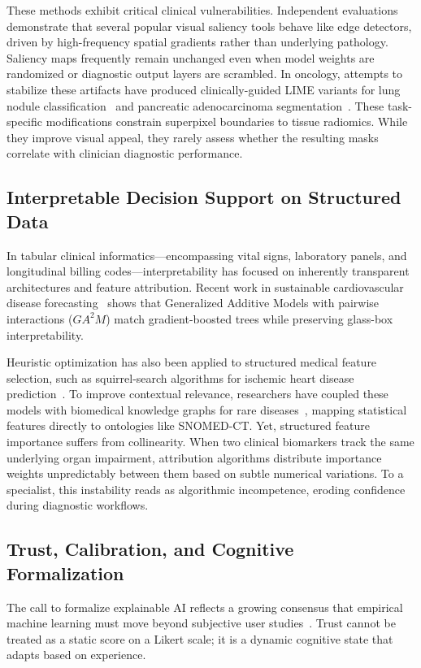 \documentclass[10pt,journal,compsoc]{IEEEtran}
\begin{document}
These methods exhibit critical clinical vulnerabilities. Independent evaluations demonstrate that several popular visual saliency tools behave like edge detectors, driven by high-frequency spatial gradients rather than underlying pathology. Saliency maps frequently remain unchanged even when model weights are randomized or diagnostic output layers are scrambled. In oncology, attempts to stabilize these artifacts have produced clinically-guided LIME variants for lung nodule classification~\cite{alshukri2026clinically} and pancreatic adenocarcinoma segmentation~\cite{badr2025xai}. These task-specific modifications constrain superpixel boundaries to tissue radiomics. While they improve visual appeal, they rarely assess whether the resulting masks correlate with clinician diagnostic performance.

\subsection{Interpretable Decision Support on Structured Data}
In tabular clinical informatics---encompassing vital signs, laboratory panels, and longitudinal billing codes---interpretability has focused on inherently transparent architectures and feature attribution. Recent work in sustainable cardiovascular disease forecasting~\cite{kvapilova2026sustainable} shows that Generalized Additive Models with pairwise interactions ($GA^2M$) match gradient-boosted trees while preserving glass-box interpretability. 

Heuristic optimization has also been applied to structured medical feature selection, such as squirrel-search algorithms for ischemic heart disease prediction~\cite{hemapraba2026xai}. To improve contextual relevance, researchers have coupled these models with biomedical knowledge graphs for rare diseases~\cite{soman2026knowledge}, mapping statistical features directly to ontologies like SNOMED-CT. Yet, structured feature importance suffers from collinearity. When two clinical biomarkers track the same underlying organ impairment, attribution algorithms distribute importance weights unpredictably between them based on subtle numerical variations. To a specialist, this instability reads as algorithmic incompetence, eroding confidence during diagnostic workflows.

\subsection{Trust, Calibration, and Cognitive Formalization}
The call to formalize explainable AI reflects a growing consensus that empirical machine learning must move beyond subjective user studies~\cite{watson2026explainable}. Trust cannot be treated as a static score on a Likert scale; it is a dynamic cognitive state that adapts based on experience. 
\end{document}
